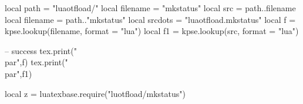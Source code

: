 \documentclass{article}
\begin{document}
\begin{luacode}
local path = "luaotfload/"
local filename = "mkstatus"
local src = path..filename
local filename = path.."mkstatus"
local srcdots = "luaotfload.mkstatus"
local f = kpse.lookup(filename, {format = "lua"})
local f1 = kpse.lookup(src, {format = "lua"})

-- success
tex.print("\\par",f)
tex.print("\\par",f1)

local z = luatexbase.require("luotfload/mkstatus")

\end{luacode}
\end{document}
